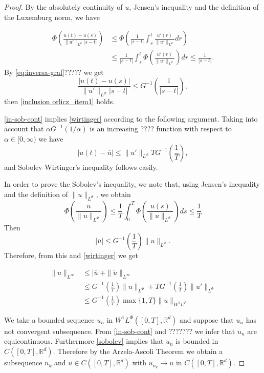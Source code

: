 \documentclass[twoside]{article}
\theoremstyle{remark}
\newcommand{\orlnor}{\|_{L^{\Phi}}}
\newcommand{\linf}{\|_{L^{\infty}}}
\newcommand{\lphi}{L^{\Phi}}
\newcommand{\wphi}{W^{1}\lphi}
\newcommand{\sobnor}{\|_{W^{1}\lphi}}
\newcommand{\rr}{\mathbb{R}}
\renewcommand{\leq}{\leqslant}
\begin{document}
\begin{proof} By the absolutely continuity of $u$, Jensen's inequality and the definition of 
the Luxemburg norm, we have

\[
 \begin{split}
    \Phi\left( \frac{u(t)-u(s)}{\|u'\orlnor |s-t|}\right) &\leq  \Phi\left( \frac{1}{ |s-t|}\int_s^t  \frac{u'(r)}{\|u'\orlnor }dr\right)\\
    &\leq   \frac{1}{ |s-t|}\int_s^t  \Phi\left(\frac{u'(r)}{\|u'\orlnor }\right)dr
    \leq \frac{1}{ |s-t|}.
 \end{split}
\]
By \eqref{eq:inversa-gral}????? we get
\[
    \frac{|u(t)-u(s)|}{\|u'\orlnor |s-t|} 
    \leq  G^{-1}\left(\frac{1}{ |s-t|}\right),
\]
then  \ref{inclusion orlicz_item1} holds.

\ref{in-sob-cont}  implies \ref{wirtinger} according to the following argument.  
Taking into account that $\alpha G^{-1}(1/\alpha)$ is an increasing ???? function
with respect to $\alpha\in [0,\infty)$ we have
\[|u(t)-\overline{u}|\leq  \|u'\orlnor T G^{-1}\left(\frac{1}{T}\right),\]
and Sobolev-Wirtinger's inequality follows easily.

In order to prove the Sobolev's inequality, we note that, using Jensen's inequality and 
the definition of $\|u\orlnor$, we obtain
\[ \Phi\left( \frac{ \overline{u}}{\|u\orlnor} \right) \leq
\frac{1}{T}\int_0^T\Phi\left(\frac{u(s)}{\|u\orlnor}\right)ds\leq\frac{1}{T}
\]
Then
\[|\overline{u}|\leq G^{-1}\left(\frac{1}{T}\right) \|u\orlnor.\]
Therefore, from this and \eqref{wirtinger} we get

\[\begin{split}
 \|u\linf &\leq |\overline{u}|+\|\tilde{u}\linf\\
 &\leq  
 G^{-1}\left(\frac{1}{T}\right) \|u\orlnor+T G^{-1}\left(\frac{1}{T}\right)\|u'\orlnor\\
 &\leq G^{-1}\left(\frac{1}{T}\right)\max\{1,T\}\|u\sobnor
 \end{split}
 \]
 



We take a bounded sequence
$u_n$ in $\wphi([0,T],\rr^d)$ and suppose that $u_n$ has not convergent subsequence.
From \eqref{in-sob-cont} and ???????   we infer that $u_n$ are equicontinuous. Furthermore \eqref{sobolev} implies that $u_n$ is bounded in $C([0,T],\rr^d)$. Therefore by the Arzela-Ascoli Theorem we  obtain a subsequence $n_k$ and  $u\in C([0,T],\rr^d)$ with $u_{n_k}\to u$ in $C([0,T],\rr^d)$.

\end{proof}
\end{document}
